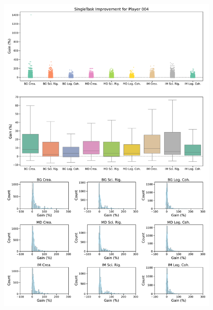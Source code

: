 \begin{figure}[ht]
  \centering
  \includegraphics[width=\textwidth]{figures/gain_validity/singletask/singletask_gain_player_00004.pdf}
\end{figure}
\clearpage

